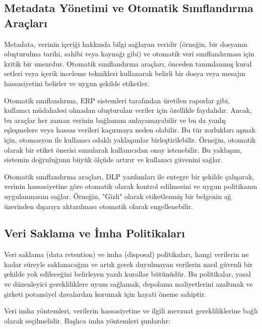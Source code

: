 \subsection{Metadata Yönetimi ve Otomatik Sınıflandırma Araçları}

Metadata, verinin içeriği hakkında bilgi sağlayan veridir (örneğin, bir dosyanın oluşturulma tarihi, sahibi veya kaynağı gibi) ve otomatik veri sınıflandırması için kritik bir unsurdur. Otomatik sınıflandırma araçları, önceden tanımlanmış kural setleri veya içerik inceleme teknikleri kullanarak belirli bir dosya veya mesajın hassasiyetini belirler ve uygun şekilde etiketler.

Otomatik sınıflandırma, ERP sistemleri tarafından üretilen raporlar gibi, kullanıcı müdahalesi olmadan oluşturulan veriler için özellikle faydalıdır. Ancak, bu araçlar her zaman verinin bağlamını anlayamayabilir ve bu da yanlış eşleşmelere veya hassas verileri kaçırmaya neden olabilir. Bu tür zorlukları aşmak için, otomasyon ile kullanıcı odaklı yaklaşımlar birleştirilebilir. Örneğin, otomatik olarak bir etiket önerisi sunularak kullanıcıdan onay istenebilir. Bu yaklaşım, sistemin doğruluğunu büyük ölçüde artırır ve kullanıcı güvenini sağlar.

Otomatik sınıflandırma araçları, DLP yazılımları ile entegre bir şekilde çalışarak, verinin hassasiyetine göre otomatik olarak kontrol edilmesini ve uygun politikanın uygulanmasını sağlar. Örneğin, "Gizli" olarak etiketlenmiş bir belgenin ağ üzerinden dışarıya aktarılması otomatik olarak engellenebilir.

\subsection{Veri Saklama ve İmha Politikaları}

Veri saklama (data retention) ve imha (disposal) politikaları, hangi verilerin ne kadar süreyle saklanacağını ve artık gerek duyulmayan verilerin nasıl güvenli bir şekilde yok edileceğini belirleyen yazılı kurallar bütünüdür. Bu politikalar, yasal ve düzenleyici gerekliliklere uyum sağlamak, depolama maliyetlerini azaltmak ve şirketi potansiyel davalardan korumak için hayati öneme sahiptir.

Veri imha yöntemleri, verilerin hassasiyetine ve ilgili mevzuat gerekliliklerine bağlı olarak seçilmelidir. Başlıca imha yöntemleri şunlardır:

